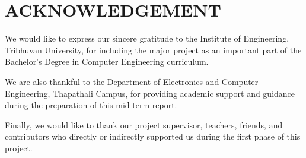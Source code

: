\chapter*{ACKNOWLEDGEMENT}
{}

We would like to express our sincere gratitude to the Institute of Engineering, Tribhuvan University, for including the major project as an important part of the Bachelor's Degree in Computer Engineering curriculum.

We are also thankful to the Department of Electronics and Computer Engineering, Thapathali Campus, for providing academic support and guidance during the preparation of this mid-term report.

Finally, we would like to thank our project supervisor, teachers, friends, and contributors who directly or indirectly supported us during the first phase of this project.

\vspace{1em}
\noindent \authorTable
